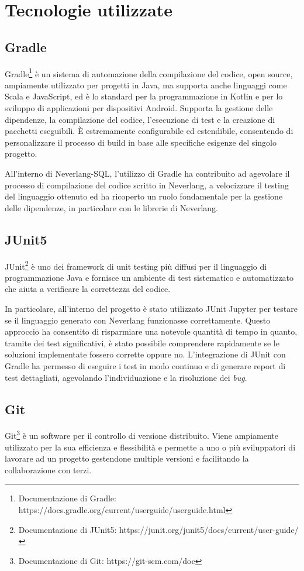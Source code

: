 \documentclass[12pt,a4paper,openright,twoside]{book}
\begin{document}
\section{Tecnologie utilizzate}

\subsection{Gradle}
Gradle\footnote{Documentazione di Gradle: https://docs.gradle.org/current/userguide/userguide.html} è un sistema di automazione della 
compilazione del codice, open source, ampiamente utilizzato per progetti in Java, ma supporta anche linguaggi come Scala e JavaScript, ed è 
lo standard per la programmazione in Kotlin e per lo sviluppo di applicazioni per dispositivi Android. Supporta la gestione delle dipendenze, 
la compilazione del codice, l’esecuzione di test e la creazione di pacchetti eseguibili. È estremamente configurabile ed estendibile, 
consentendo di personalizzare il processo di build in base alle specifiche esigenze del singolo progetto.

All’interno di Neverlang-SQL, l’utilizzo di Gradle ha contribuito ad agevolare il processo di compilazione del codice scritto in Neverlang, a 
velocizzare il testing del linguaggio ottenuto ed ha ricoperto un ruolo fondamentale per la gestione delle dipendenze, in particolare con le 
librerie di Neverlang.

\subsection{JUnit5}
JUnit\footnote{Documentazione di JUnit5: https://junit.org/junit5/docs/current/user-guide/} è uno dei framework di unit testing più diffusi 
per il linguaggio di programmazione Java e fornisce un ambiente di test sistematico e automatizzato che aiuta a verificare la correttezza del 
codice.

In particolare, all’interno del progetto è stato utilizzato JUnit Jupyter per testare se il linguaggio generato con Neverlang funzionasse 
correttamente. Questo approccio ha consentito di risparmiare una notevole quantità di tempo in quanto, tramite dei test significativi, è stato 
possibile comprendere rapidamente se le soluzioni implementate fossero corrette oppure no. L’integrazione di JUnit con Gradle ha permesso di 
eseguire i test in modo continuo e di generare report di test dettagliati, agevolando l’individuazione e la risoluzione dei \textit{bug}.

\subsection{Git}
Git\footnote{Documentazione di Git: https://git-scm.com/doc} è un software per il controllo di versione distribuito. Viene ampiamente 
utilizzato per la sua efficienza e flessibilità e permette a uno o più sviluppatori di lavorare ad un progetto gestendone multiple versioni e 
facilitando la collaborazione con terzi.
\end{document}
